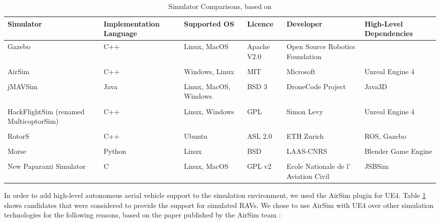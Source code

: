 \begin{center}
\begin{table}[H]
\footnotesize
\centering
\begin{tabular}{ p{2.2cm} p{2.2cm} p{2.3cm} p{1.5cm} p{2.3cm} p{2.3cm}} 
\hline
Simulator & Implementation Language & Supported OS & Licence & Developer & High-Level Dependencies\\
\hline
Gazebo \cite{Koenig2005DesignSimulator} & C++ & Linux, MacOS & Apache V2.0 & Open Source Robotics Foundation & \\
\\
AirSim \cite{Shah2017AirSim:Vehicles} & C++ & Windows, Linux & MIT & Microsoft & Unreal Engine 4\\ 
\\
jMAVSim \cite{jMAVSim} & Java & Linux, MacOS, Windows & BSD 3 & DroneCode Project & Java3D\\
\\
HackFlightSim (renamed MulticoptorSim) \cite{MulticopterSim} & C++ & Linux, Windows & GPL & Simon Levy & Unreal Engine 4 \\
\\
RotorS \cite{RotorS} & C++ & Ubuntu & ASL 2.0 & ETH Zurich & ROS, Gazebo\\
\\
Morse \cite{Echeverria2011ModularMORSE} & Python & Linux & BSD & LAAS-CNRS & Blender Game Engine \\
\\
New Paparazzi Simulator \cite{Hattenberger2014UsingResearch} & C & Linux, MacOS & GPL v2 & Ecole Nationale de l’ Aviation Civil & JSBSim\\
\hline
\end{tabular}
\caption{Simulator Comparisons, based on \cite{Ebeid2018ASimulators}}
\label{table:SimulatorComparison}
\end{table}
\end{center}
In order to add high-level autonomous aerial vehicle support to the simulation environment, we used the AirSim \cite{Shah2017AirSim:Vehicles} plugin for UE4. Table \ref{table:SimulatorComparison} shows candidates that were considered to provide the support for simulated RAVs. We chose to use AirSim with UE4 over other simulation technologies for the following reasons, based on the paper published by the AirSim team \cite{Shah2017AirSim:Vehicles}:

